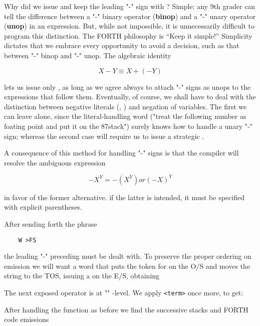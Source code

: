 \leftbar[1\linewidth]
Why did we issue  and keep the leading "-" sign with ? Simple: any 9th grader can tell the difference between a "-" binary operator (\textbf{binop}) and a "-" unary operator (\textbf{unop}) in an expression. But, while not impossible, it is unnecessarily difficult to program this distinction. The FORTH philosophy is “Keep it simple!” Simplicity dictates that we embrace every opportunity to avoid a decision, such as that between "-" binop and "-" unop. The algebraic identity
\endleftbar

\begin{equation*}
X - Y \equiv X + (-Y)
\end{equation*}

\leftbar[1\linewidth]
lets us issue only  , as long as we agree always to attach "-" signs as unops to the expressions that follow them. Eventually, of course, we shall have to deal with the distinction between negative literals (, \eg) and negation of variables. The first we can leave alone, since the literal-handling word \bc{\%} ("treat the following number as foating point and put it on the 87stack") surely knows how to handle a unary "-" sign; whereas the second case will require us to issue a strategic .
\endleftbar

A consequence of this method for handling "-" signs is that the
compiler will resolve the ambiguous expression

\begin{equation*}
-X^{Y} = -(X^{Y}) or (-X)^{Y}
\end{equation*}

in favor of the former alternative. if the latter is intended, it must be specified with explicit parentheses.

After sending forth the phrase

\begin{lstlisting}
    W >FS
\end{lstlisting}

the leading "-" preceding  must be dealt with. To preserve the proper ordering on emission we will want a word  that puts the token for  on the O/S and moves the string  to the TOS, issuing a  on the E/S, obtaining

The next exposed operator is at "\bc{\%}" -level. We apply \texttt{<term>} once more, to get:

After handling the function as before we find the successive stacks and FORTH code emissions


